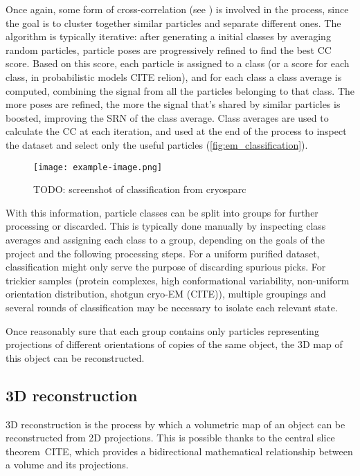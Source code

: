 Once again, some form of cross-correlation (see ) is involved in the process, since the goal is to cluster together similar particles and separate different ones.
The algorithm is typically iterative: after generating a initial classes by averaging random particles, particle poses are progressively refined to find the best CC score.
Based on this score, each particle is assigned to a class (or a score for each class, in probabilistic models CITE relion), and for each class a class average is computed, combining the signal from all the particles belonging to that class. The more poses are refined, the more the signal that's shared by similar particles is boosted, improving the SRN of the class average.
Class averages are used to calculate the CC at each iteration, and used at the end of the process to inspect the dataset and select only the useful particles (\autoref{fig:em_classification}).

\begin{figure}[ht]
    \centering
    \texttt{[image: example-image.png]}
    \caption{TODO: screenshot of classification from cryosparc}
    \label{fig:em_classification}
\end{figure}

With this information, particle classes can be split into groups for further processing or discarded.
This is typically done manually by inspecting class averages and assigning each class to a group, depending on the goals of the project and the following processing steps.
For a uniform purified dataset, classification might only serve the purpose of discarding spurious picks.
For trickier samples (protein complexes, high conformational variability, non-uniform orientation distribution, shotgun cryo-EM (CITE)), multiple groupings and several rounds of classification may be necessary to isolate each relevant state.

Once reasonably sure that each group contains only particles representing projections of different orientations of copies of the same object, the 3D map of this object can be reconstructed.

\subsection{3D reconstruction}\label{em_reconstruction}

3D reconstruction is the process by which a volumetric map of an object can be reconstructed from 2D projections.
This is possible thanks to the central slice theorem~CITE, which provides a bidirectional mathematical relationship between a volume and its projections.

